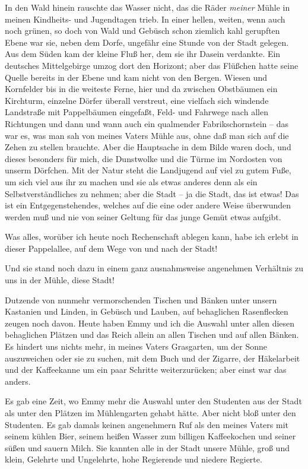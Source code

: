 In den Wald hinein rauschte das Wasser nicht, das die Räder
\emph{meiner} Mühle in meinen Kindheits- und Jugendtagen trieb. In
einer hellen, weiten, wenn auch noch grünen, so doch von Wald und
Gebüsch schon ziemlich kahl gerupften Ebene war sie, neben dem
Dorfe, ungefähr eine Stunde von der Stadt gelegen. Aus dem Süden
kam der kleine Fluß her, dem sie ihr Dasein verdankte. Ein
deutsches Mittelgebirge umzog dort den Horizont; aber das Flüßchen
hatte seine Quelle bereits in der Ebene und kam nicht von den
Bergen. Wiesen und Kornfelder bis in die weiteste Ferne, hier und
da zwischen Obstbäumen ein Kirchturm, einzelne Dörfer überall
verstreut, eine vielfach sich windende Landstraße mit Pappelbäumen
eingefaßt, Feld- und Fahrwege nach allen Richtungen und dann und
wann auch ein qualmender Fabrikschornstein – das war es, was man
sah von meines Vaters Mühle aus, ohne daß man sich auf die Zehen zu
stellen brauchte. Aber die Hauptsache in dem Bilde waren doch, und
dieses besonders für mich, die Dunstwolke und die Türme im
Nordosten von unserm Dörfchen. Mit der Natur steht die Landjugend
auf viel zu gutem Fuße, um sich viel aus ihr zu machen und sie als
etwas anderes denn als ein Selbstverständliches zu nehmen; aber die
Stadt – ja die Stadt, das ist etwas! Das ist ein Entgegenstehendes,
welches auf die eine oder andere Weise überwunden werden muß und
nie von seiner Geltung für das junge Gemüt etwas aufgibt.

Was alles, worüber ich heute noch Rechenschaft ablegen kann, habe
ich erlebt in dieser Pappelallee, auf dem Wege von und nach der
Stadt!

Und sie stand noch dazu in einem ganz ausnahmsweise angenehmen
Verhältnis zu uns in der Mühle, diese Stadt!

Dutzende von nunmehr vermorschenden Tischen und Bänken unter unsern
Kastanien und Linden, in Gebüsch und Lauben, auf behaglichen
Rasenflecken zeugen noch davon. Heute haben Emmy und ich die
Auswahl unter allen diesen behaglichen Plätzen und das Reich allein
an allen Tischen und auf allen Bänken. Es hindert uns nichts mehr,
in meines Vaters Grasgarten, um der Sonne auszuweichen oder sie zu
suchen, mit dem Buch und der Zigarre, der Häkelarbeit und der
Kaffeekanne um ein paar Schritte weiterzurücken; aber einst war das
anders.

Es gab eine Zeit, wo Emmy mehr die Auswahl unter den Studenten aus
der Stadt als unter den Plätzen im Mühlengarten gehabt hätte. Aber
nicht bloß unter den Studenten. Es gab damals keinen angenehmern
Ruf als den meines Vaters mit seinem kühlen Bier, seinem heißen
Wasser zum billigen Kaffeekochen und seiner süßen und sauern Milch.
Sie kannten alle in der Stadt unsere Mühle, groß und klein,
Gelehrte und Ungelehrte, hohe Regierende und niedere Regierte.

